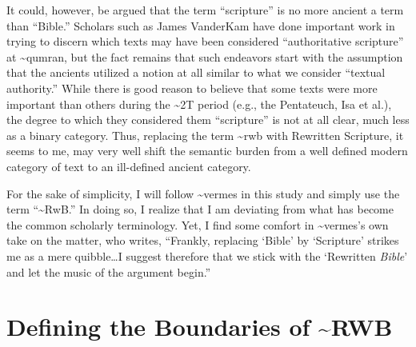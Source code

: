 It could, however, be argued that the term ``scripture'' is no more
ancient a term than ``Bible.'' Scholars such as James VanderKam have
done important work in trying to discern which texts may have been
considered ``authoritative scripture'' at
\textasciitilde{}qumran,\autocite{vanderkam_dsd1998} but the fact
remains that such endeavors start with the assumption that the ancients
utilized a notion at all similar to what we consider ``textual
authority.'' While there is good reason to believe that some texts were
more important than others during the \textasciitilde{}2T period (e.g.,
the Pentateuch, Isa et al.), the degree to which they considered them
``scripture'' is not at all clear, much less as a binary category. Thus,
replacing the term \textasciitilde{}rwb with Rewritten Scripture, it
seems to me, may very well shift the semantic burden from a well defined
modern category of text to an ill-defined ancient category.

For the sake of simplicity, I will follow \textasciitilde{}vermes in
this study and simply use the term ``\textasciitilde{}RwB.'' In doing
so, I realize that I am deviating from what has become the common
scholarly terminology. Yet, I find some comfort in
\textasciitilde{}vermes's own take on the matter, who writes, ``Frankly,
replacing `Bible' by `Scripture' strikes me as a mere quibble\ldots{}I
suggest therefore that we stick with the `Rewritten \emph{Bible}' and
let the music of the argument begin.''\autocite[original
emphasis]{vermes_zsengeller2014}

\hypertarget{defining-the-boundaries-of-rwb}{%
\section{Defining the Boundaries of
\textasciitilde{}RWB}\label{defining-the-boundaries-of-rwb}}

